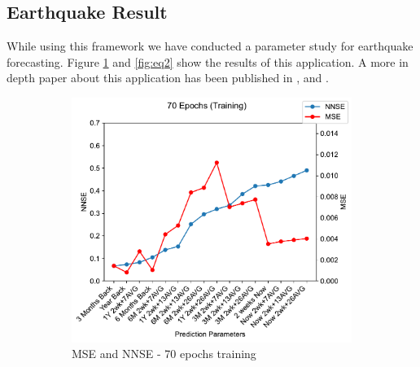 
\subsection{Earthquake Result}

While using this framework we have conducted a parameter study for earthquake forecasting. Figure \ref{fig:eq1} and \ref{fig:eq2} show the results of this application. A more in depth paper about this application has been published in \cite{las-2023-mlcommons-edu-eq}, \cite{las-2023-escience} and \cite{las-2023-ai-workflow}.

\begin{figure}[p]
     \centering
     \begin{subfigure}[b]{0.49\textwidth}
        \centering\includegraphics[width=1.0\linewidth]{images/70_training-MSE-and-NNSE.pdf}
        \caption{MSE and NNSE - 70 epochs training}
        \label{fig:eq1}
     \end{subfigure}
     \hfill
     \begin{subfigure}[b]{0.49\textwidth}

\end{subfigure}
\end{figure}
